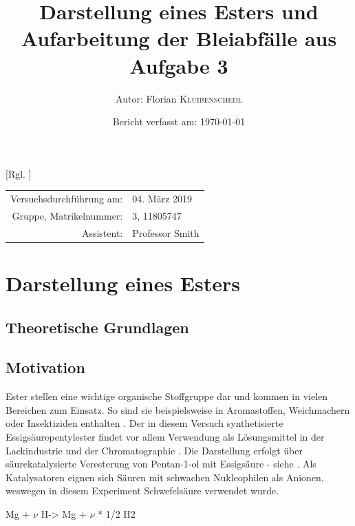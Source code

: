 \documentclass{article}
\title{Darstellung eines Esters und Aufarbeitung der Bleiabfälle aus Aufgabe 3} %
\author{Autor: Florian \textsc{Kluibenschedl}} %
\date{Bericht verfasst am: \today} %
\begin{document}
  [Rgl. ]{}{}
  
  \maketitle %
  
  \begin{center}
    \begin{tabular}{r l}
      Versuchsdurchführung am: & 04. März 2019\\ %
      Gruppe, Matrikelnummer: & 3, 11805747 \\
      Assistent: & Professor Smith %
    \end{tabular}
  \end{center}


  \begin{abstract}
    
  \end{abstract}
  
  \section{Darstellung eines Esters}
   
    \subsection{Theoretische Grundlagen}
  
      \subsection{Motivation} \label{sec:Motivation}
        
        Ester stellen eine wichtige organische Stoffgruppe dar und kommen in vielen Bereichen zum Einsatz. So sind sie beispielsweise in Aromastoffen, Weichmachern oder Insektiziden enthalten \cite{EsterEigenschaften}. Der in diesem Versuch synthetisierte Essigsäurepentylester findet vor allem Verwendung als Lösungsmittel in der Lackindustrie und der Chromatographie \cite{Essigsaurepentyl}. Die Darstellung erfolgt über säurekatalysierte Veresterung von Pentan-1-ol mit Essigsäure - siehe . Als Katalysatoren eignen sich Säuren mit schwachen Nukleophilen als Anionen, weswegen in diesem Experiment Schwefelsäure verwendet wurde.
        
  \begin{reaction}
    Mg\sld{} + $\nu$ H\pch\aq -> Mg\pch[$\nu$] \aq{} + $\nu$ * 1/2 H2\gas{} \label{rec:MagnesiumWasserstoffAllgemein}
  \end{reaction}
  
\end{document}
